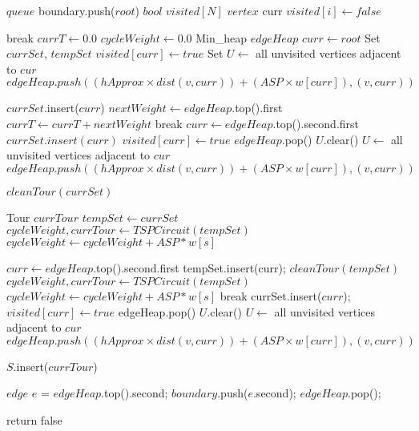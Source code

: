 \begin{algorithm}
\begin{algorithmic}

\State $queue$ boundary.push($root$) 
\State $bool$ $visited[N]$
\State $vertex$ curr 
	\State $visited[i] \gets false$ 
\EndFor

		\State break
	\EndIf
	\State $currT \gets 0.0$ 
	\State $cycleWeight \gets 0.0$ 
	\State Min\_heap $edgeHeap$  
	\State $curr \gets root$ 
	\State Set $currSet$, $tempSet$ 
	\State $visited[curr] \gets true$ 
	\State Set $U \gets$ all unvisited vertices adjacent to $cur$ 
		\State $edgeHeap.push((hApprox \times dist(v,curr)) + (ASP\times w[curr]) , (v,curr))$ 
	\EndFor

	\State $currSet$.insert($curr$) 
		\State $nextWeight \gets edgeHeap$.top().first 
		\State $currT \gets currT + nextWeight$ 
			break 
		\EndIf
		\State $curr \gets edgeHeap$.top().second.first 
		\State $currSet.insert(curr)$ 
		\State $visited[curr] \gets true$ 
		\State $edgeHeap$.pop() 
		\State $U$.clear() 
		\State $U \gets$ all unvisited vertices adjacent to $cur$ 
			\State $edgeHeap.push((hApprox \times dist(v,curr)) + (ASP\times w[curr]) , (v,curr))$ 
		\EndFor
	\EndWhile

	\State $cleanTour(currSet)$
	
	\State Tour $currTour$ 
	\State $tempSet \gets currSet$ 
	\State $cycleWeight , currTour \gets TSPCircuit(tempSet)$
		$cycleWeight \gets cycleWeight + ASP*w[s]$
	\EndFor
	
		\State $curr \gets edgeHeap$.top().second.first 
		\State tempSet.insert(curr);
		\State $cleanTour(tempSet)$
		\State $cycleWeight, currTour \gets TSPCircuit(tempSet)$ 
			$cycleWeight \gets cycleWeight + ASP*w[s]$
		\EndFor
			\State break 
		\EndIf
		\State currSet.insert($curr$);
		\State $visited[curr] \gets true$ 
		\State edgeHeap.pop() 
		\State $U$.clear() 
		\State $U  \gets$ all unvisited vertices adjacent to $cur$ 
			\State $edgeHeap.push((hApprox \times dist(v,curr)) + (ASP\times w[curr]) , (v,curr))$ 
		\EndFor
	\EndWhile
	
	\State $S$.insert($currTour$) 

		\State $edge$ $e$ = $edgeHeap$.top().second;
		\State $boundary$.push($e$.second);
		\State $edgeHeap$.pop();
	\EndWhile
	
		\State return false 
	\EndIf

\EndWhile
\EndFunction

\EndFunction

\end{algorithmic}
\end{algorithm}

